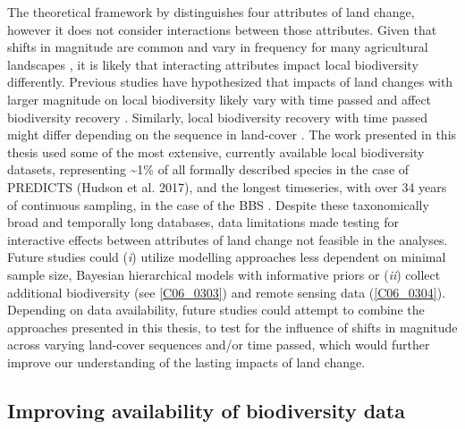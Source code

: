 The theoretical framework by \cite{Watson2014} distinguishes four attributes of land change, however it does not consider interactions between those attributes. Given that shifts in magnitude are common and vary in frequency for many agricultural landscapes \citep{Kleyer2007}, it is likely that interacting attributes impact local biodiversity differently. Previous studies have hypothesized that impacts of land changes with larger magnitude on local biodiversity likely vary with time passed and affect biodiversity recovery \citep{Shackelford2017}. Similarly, local biodiversity recovery with time passed might differ depending on the sequence in land-cover \citep{Chazdon2003,Martin2013}. The work presented in this thesis used some of the most extensive, currently available local biodiversity datasets, representing \textasciitilde 1\% of all formally described species in the case of PREDICTS \citep{Hudson2016}(Hudson et al. 2017), and the longest timeseries, with over 34 years of continuous sampling, in the case of the BBS \citep[, Figure \ref{F01_01}]{Pardieck2018}. Despite these taxonomically broad and temporally long databases, data limitations made testing for interactive effects between attributes of land change not feasible in the analyses. Future studies could (\textit{i}) utilize modelling approaches less dependent on minimal sample size, \eg Bayesian hierarchical models with informative priors \citep{Iknayan2014} or (\textit{ii}) collect additional biodiversity (see \ref{C06_0303}) and remote sensing data (\ref{C06_0304}). Depending on data availability, future studies could attempt to combine the approaches presented in this thesis, \ie to test for the influence of shifts in magnitude across varying land-cover sequences and/or time passed, which would further improve our understanding of the lasting impacts of land change.

\subsection{Improving availability of biodiversity data}
\label{C03_0303}


